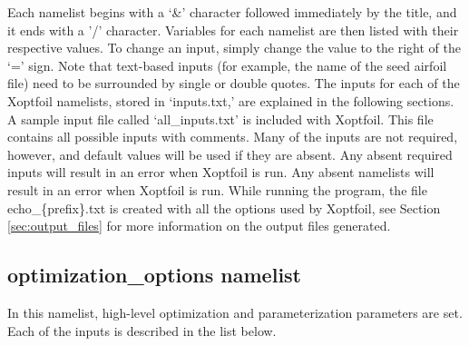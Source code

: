 \documentclass[11pt]{article}
\begin{document}
Each namelist begins with a `\&' character followed immediately by the title, and it ends with 
a '/' character.  Variables for each namelist are then listed with their respective
values.  To change an input, simply change the value to the right of the `=' sign.  Note
that text-based inputs (for example, the name of the seed airfoil file) need to be
surrounded by single or double quotes. The inputs for each of the Xoptfoil namelists,
stored in `inputs.txt,' are explained in the following sections. A sample input file
called `all\_inputs.txt' is included with Xoptfoil. This file contains all possible
inputs with comments. Many of the inputs are not required, however, and default values
will be used if they are absent. Any absent required inputs will result in an error when
Xoptfoil is run. Any absent namelists will result in an error when Xoptfoil is run.
While running the program, the file echo\_\{prefix\}.txt is created with 
all the options used by Xoptfoil, see Section \ref{sec:output_files} for more information on the
output files generated.

\subsection{optimization\_options namelist}

In this namelist, high-level optimization and parameterization parameters are set.  Each
of the inputs is described in the list below.
\end{document}

